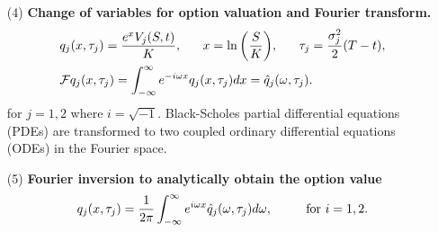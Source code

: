 \documentclass[11pt,letter]{article}
\theoremstyle{definition}
\theoremstyle{remark}
\numberwithin{equation}{section}
\begin{document}
\begin{itemize}
    \item[(4)] \textbf{Change of variables for option valuation and Fourier transform.}
    \begin{align*}
        &q_j(x,\tau_j)=\frac{e^xV_j(S,t)}{K},~~~~~x=\ln\bigg(\frac{S}{K}\bigg),~~~~~\tau_j=\frac{\sigma_j^2}{2}(T-t),\\
        &\mathcal{F}q_j(x,\tau_j)=\int_{-\infty}^\infty e^{-i\omega x}q_j(x,\tau_j)dx=\hat{q}_j(\omega,\tau_j).
    \end{align*}
    for $j=1,2$ where $i=\sqrt{-1}$. Black-Scholes partial differential equations (PDEs) are transformed to two coupled ordinary differential equations (ODEs) in the Fourier space.
    
    \item[(5)] \textbf{Fourier inversion to analytically obtain the option value}
    \begin{align*}
        q_j(x,\tau_j)=\frac{1}{2\pi}\int_{-\infty}^\infty e^{i\omega x}\hat{q}_j(\omega,\tau_j)d\omega,~~~~~~~~\text{for $i=1,2$}.
    \end{align*}
\end{itemize}
\end{document}
